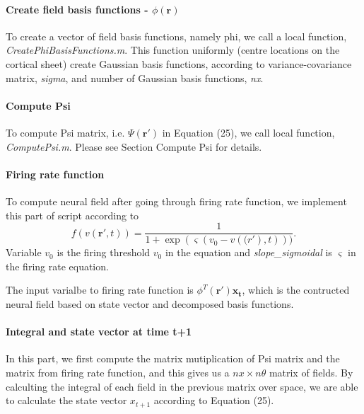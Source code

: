 \documentclass[a4paper, 12pt, english]{article}
\begin{document}
\paragraph{Create field basis functions - $\phi(\boldsymbol{r}) $\newline}
To create a vector of field basis functions, namely phi, we call a local function,
\textit{CreatePhiBasisFunctions.m}. This function uniformly (centre locations on the cortical sheet)
create Gaussian basis functions, according to variance-covariance matrix, \textit{sigma},
and number of Gaussian basis functions, \textit{nx}.

\paragraph{Compute Psi\newline}
To compute Psi matrix, i.e. $\Psi(\boldsymbol{r\prime}) $ in Equation (25),
we call local function, \textit{ComputePsi.m}. Please see Section Compute Psi
for details.

\paragraph{Firing rate function\newline}
To compute neural field after going through firing rate function, we implement this
part of script according to
$$f(v(\boldsymbol{r\prime}, t)) = \frac{1}{1+\exp(\varsigma(v_0-v(\boldsymbol(r\prime), t)))}. $$\newline
Variable $v_0 $ is the firing threshold $v_0 $ in the equation and \textit{slope\_sigmoidal}
is $\varsigma $ in the firing rate equation.

The input varialbe to firing rate function is $\phi^T(\boldsymbol{r\prime})\boldsymbol{x_{t}} $,
which is the contructed neural field based on state vector and decomposed basis functions.

\paragraph{Integral and state vector at time t+1\newline}
In this part, we first compute the matrix mutiplication of Psi matrix and the matrix from firing rate function,
and this gives us a $nx\times n\theta$ matrix of fields.
By calculting the integral of each field in the previous matrix over space, we are
able to calculate the state vector $x_{t+1} $ according to Equation (25).
\end{document}
